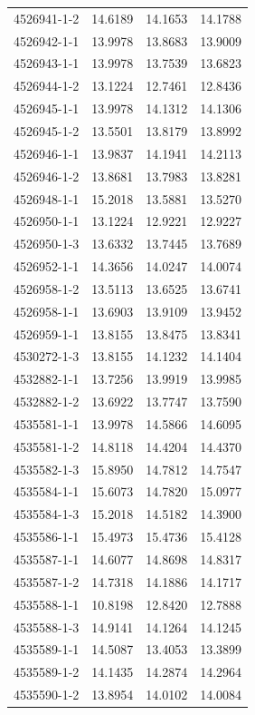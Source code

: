 \begin{longtable}{lrrr}
4526941-1-2 & 14.6189 & 14.1653 & 14.1788 \\
4526942-1-1 & 13.9978 & 13.8683 & 13.9009 \\
4526943-1-1 & 13.9978 & 13.7539 & 13.6823 \\
4526944-1-2 & 13.1224 & 12.7461 & 12.8436 \\
4526945-1-1 & 13.9978 & 14.1312 & 14.1306 \\
4526945-1-2 & 13.5501 & 13.8179 & 13.8992 \\
4526946-1-1 & 13.9837 & 14.1941 & 14.2113 \\
4526946-1-2 & 13.8681 & 13.7983 & 13.8281 \\
4526948-1-1 & 15.2018 & 13.5881 & 13.5270 \\
4526950-1-1 & 13.1224 & 12.9221 & 12.9227 \\
4526950-1-3 & 13.6332 & 13.7445 & 13.7689 \\
4526952-1-1 & 14.3656 & 14.0247 & 14.0074 \\
4526958-1-2 & 13.5113 & 13.6525 & 13.6741 \\
4526958-1-1 & 13.6903 & 13.9109 & 13.9452 \\
4526959-1-1 & 13.8155 & 13.8475 & 13.8341 \\
4530272-1-3 & 13.8155 & 14.1232 & 14.1404 \\
4532882-1-1 & 13.7256 & 13.9919 & 13.9985 \\
4532882-1-2 & 13.6922 & 13.7747 & 13.7590 \\
4535581-1-1 & 13.9978 & 14.5866 & 14.6095 \\
4535581-1-2 & 14.8118 & 14.4204 & 14.4370 \\
4535582-1-3 & 15.8950 & 14.7812 & 14.7547 \\
4535584-1-1 & 15.6073 & 14.7820 & 15.0977 \\
4535584-1-3 & 15.2018 & 14.5182 & 14.3900 \\
4535586-1-1 & 15.4973 & 15.4736 & 15.4128 \\
4535587-1-1 & 14.6077 & 14.8698 & 14.8317 \\
4535587-1-2 & 14.7318 & 14.1886 & 14.1717 \\
4535588-1-1 & 10.8198 & 12.8420 & 12.7888 \\
4535588-1-3 & 14.9141 & 14.1264 & 14.1245 \\
4535589-1-1 & 14.5087 & 13.4053 & 13.3899 \\
4535589-1-2 & 14.1435 & 14.2874 & 14.2964 \\
4535590-1-2 & 13.8954 & 14.0102 & 14.0084 \\

\end{longtable}
